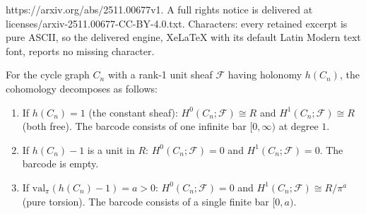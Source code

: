 \documentclass[10pt,a4paper]{amsart}
\newcommand{\Ring}{R}                          %
\newcommand{\sheaf}[1]{\mathcal{#1}}                  %
\newcommand{\unif}{\pi}                        %
\newcommand{\valpi}{\mathrm{val}_{\unif}}                   %
\begin{document}
https://arxiv.org/abs/2511.00677v1. A full rights notice is delivered at licenses/arxiv-2511.00677-CC-BY-4.0.txt. Characters: every retained excerpt is pure ASCII, so the delivered engine, XeLaTeX with its default Latin Modern text font, reports no missing character.
\begin{theorem}
\label{thm:cycle-barcode}
For the cycle graph $C_n$ with a rank-1 unit sheaf $\sheaf{F}$ having holonomy $h(C_n)$, the cohomology decomposes as follows:
\begin{enumerate}[label=\textup{(\roman*)}]
\item If $h(C_n) = 1$ (the constant sheaf): $H^0(C_n;\sheaf{F}) \cong \Ring$ and $H^1(C_n;\sheaf{F}) \cong \Ring$ (both free). The barcode consists of one infinite bar $[0,\infty)$ at degree $1$.

\item If $h(C_n) - 1$ is a unit in $\Ring$: $H^0(C_n;\sheaf{F}) = 0$ and $H^1(C_n;\sheaf{F}) = 0$. The barcode is empty.

\item If $\valpi(h(C_n)-1) = a > 0$: $H^0(C_n;\sheaf{F}) = 0$ and $H^1(C_n;\sheaf{F}) \cong \Ring/\unif^a$ (pure torsion). The barcode consists of a single finite bar $[0,a)$.
\end{enumerate}
\end{theorem}
\end{document}

